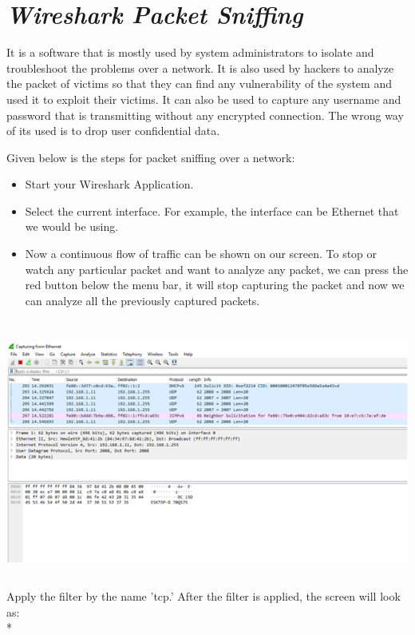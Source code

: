 \documentclass[a4paper,12pt]{report}
\begin{document}
\chapter{\emph{Wireshark Packet Sniffing}}

It is a software that is mostly used by system administrators to isolate
and troubleshoot the problems over a network. It is also used by hackers
to analyze the packet of victims so that they can find any vulnerability
of the system and used it to exploit their victims. It can also be used
to capture any username and password that is transmitting without any
encrypted connection. The wrong way of its used is to drop user
confidential data.

Given below is the steps for packet sniffing over a network:

\begin{itemize}
\item
  Start your Wireshark Application.
\item
  Select the current interface. For example, the interface can be
  Ethernet that we would be using.
\item
  Now a continuous flow of traffic can be shown on our screen. To stop
  or watch any particular packet and want to analyze any packet, we can
  press the red button below the menu bar, it will stop capturing the
  packet and now we can analyze all the previously captured packets.
\end{itemize}

\includegraphics[width=6.26772in,height=3.45833in]{image7.png}
\\
Apply the filter by the name 'tcp.' After the filter is applied, the
screen will look as:
\\*
\end{document}
